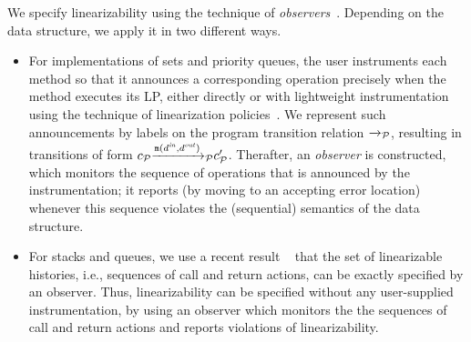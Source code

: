 We specify linearizability using the technique of
{\em observers}~\cite{AHHR:integrated,BEEH:icalp15,HSV:concur13,Quy:sas16}.
Depending on the data structure, we apply it in two different ways.
\begin{itemize}
    \item For implementations of sets and priority queues,
the user instruments each method so that it announces
a corresponding operation precisely when the method executes its LP, either
directly or with lightweight instrumentation using
the technique of linearization policies~\cite{Quy:sas16}.
We represent such announcements by labels on the program
transition relation ${\xrightarrow{}{}}_{\!\!{\mathcal P}}$, resulting in transitions of form
$c_{{\mathcal P}}{\xrightarrow{{\tt m}(d^{\it in},d^{\it out})}{}}_{\!\!{\mathcal P}}c_{{\mathcal P}}'$.
Therafter, an {\em observer} is constructed, which
monitors the sequence of operations that is announced by the
instrumentation; it reports (by moving to an accepting error location)
whenever this sequence violates the (sequential) semantics of the
data structure.
\item
  For stacks and queues, we use a recent result
~\cite{BEEH:icalp15,HSV:concur13} that the set of linearizable histories,
i.e., sequences of call and return actions,
can be exactly specified by an observer.
Thus, linearizability can be specified without
any user-supplied instrumentation, by using an observer which monitors
the the sequences of call and return actions and reports violations of
linearizability.
\end{itemize}





